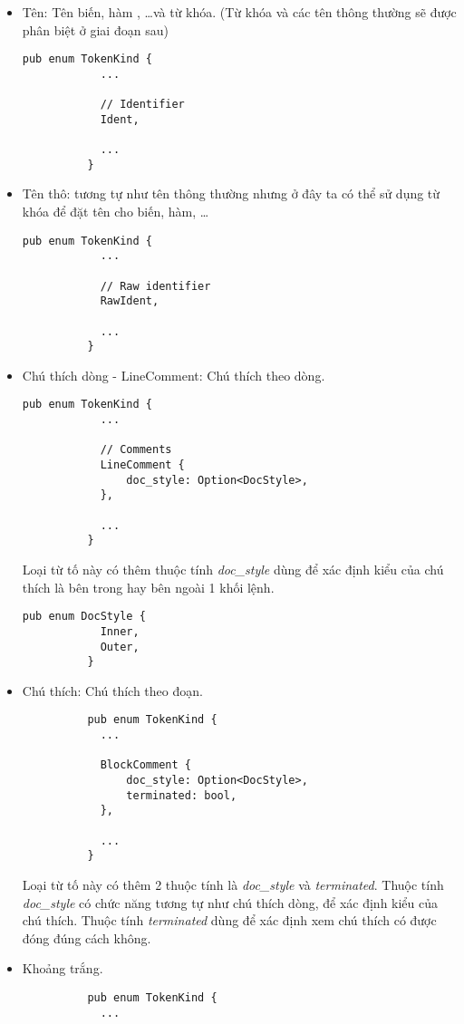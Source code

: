 \begin{itemize}
\begin{itemize}
    \end{itemize}
  \item Tên: Tên biến, hàm , \dots\space và từ khóa. (Từ khóa và các tên thông thường sẽ được phân biệt ở giai đoạn sau)
        \begin{lstlisting}[]
          pub enum TokenKind {
            ...
        
            // Identifier
            Ident,
        
            ...
          }
        \end{lstlisting}
  \item Tên thô: tương tự như tên thông thường nhưng ở đây ta có thể sử dụng từ khóa để đặt tên cho biến, hàm, \dots
        \begin{lstlisting}[]
          pub enum TokenKind {
            ...
        
            // Raw identifier
            RawIdent,
        
            ...
          }
        \end{lstlisting}
  \item Chú thích dòng - LineComment: Chú thích theo dòng. 
        \begin{lstlisting}[]
          pub enum TokenKind {
            ...
        
            // Comments
            LineComment {
                doc_style: Option<DocStyle>,
            },

            ...
          }
        \end{lstlisting}
        Loại từ tố này có thêm thuộc tính \textit{doc\_style} dùng để xác định kiểu của chú thích là bên trong hay bên ngoài 1 khối lệnh.
        \begin{lstlisting}[]
          pub enum DocStyle {
            Inner,
            Outer,
          }
        \end{lstlisting}
  \item Chú thích:  Chú thích theo đoạn. 
        \begin{lstlisting}
          pub enum TokenKind {
            ...

            BlockComment {
                doc_style: Option<DocStyle>,
                terminated: bool,
            },

            ...
          }
        \end{lstlisting}
        Loại từ tố này có thêm 2 thuộc tính là \textit{doc\_style} và \textit{terminated}. Thuộc tính \textit{doc\_style} có chức năng tương tự như chú thích dòng, để xác định kiểu của chú thích. Thuộc tính \textit{terminated} dùng để xác định xem chú thích có được đóng đúng cách không.
  \item Khoảng trắng.
        \begin{lstlisting}
          pub enum TokenKind {
            ...


\end{lstlisting}
\end{itemize}
